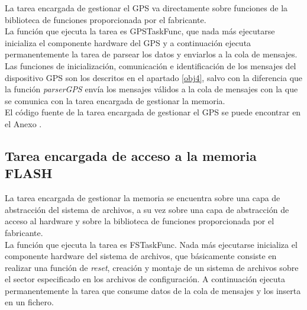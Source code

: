 La tarea encargada de gestionar el GPS va directamente sobre funciones de la biblioteca de funciones proporcionada por el fabricante.\\

La función que ejecuta la tarea es GPSTaskFunc, que nada más ejecutarse inicializa el componente hardware del GPS y a continuación ejecuta permanentemente la tarea de parsear los datos y enviarlos a la cola de mensajes.\\

Las funciones de inicialización, comunicación e identificación de los mensajes del dispositivo GPS son los descritos en el apartado \ref{obj4}, salvo con la diferencia que la función \textit{parserGPS} envía los mensajes válidos a la cola de mensajes con la que se comunica con la tarea encargada de gestionar la memoria.\\

El código fuente de la tarea encargada de gestionar el GPS se puede encontrar en el Anexo .

\subsection{Tarea encargada de acceso a la memoria FLASH}

La tarea encargada de gestionar la memoria se encuentra sobre una capa de abstracción del sistema de archivos, a su vez sobre una capa de abstracción de acceso al hardware y sobre la biblioteca de funciones proporcionada por el fabricante.\\

La función que ejecuta la tarea es FSTaskFunc. Nada más ejecutarse inicializa el componente hardware del sistema de archivos, que básicamente consiste en realizar una función de \textit{reset}, creación y montaje de un sistema de archivos sobre el sector especificado en los archivos de configuración. A continuación ejecuta permanentemente la tarea que consume datos de la cola de mensajes y los inserta en un fichero.\\
 


























